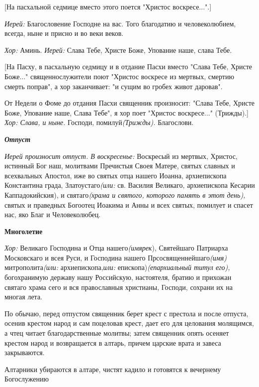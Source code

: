  [На пасхальной седмице вместо этого поется "Христос воскресе...".] 

 {\itshape  Иерей:} Благословение Господне на вас. Того благодатию и человеколюбием, всегда, ныне и присно и во веки веков.

 {\itshape  Хор:} Аминь. {\itshape  Иерей:} Слава Тебе, Христе Боже, Упование наше, слава Тебе.

     [На Пасху, в пасхальную седмицу и в отдание Пасхи вместо "Слава Тебе, Христе Боже..." священнослужители поют "Христос воскресе из мертвых, смертию смерть поправ", а хор заканчивает: "и сущим во гробех живот даровав". 

     От Недели о Фоме до отдания Пасхи священник произносит: "Слава Тебе, Христе Боже, Упование наше, Слава Тебе", я хор поет "Христос воскресе..." (Трижды).] {\itshape  Хор: Слава, и ныне.} Господи, помилуй{\itshape  (Трижды).} Благослови.  

\medskip 

 {\bfseries {\itshape  Отпуст }}

 {\itshape  Иерей произносит отпуст. В воскресенье:} Воскресый из мертвых, Христос, истинный Бог наш, молитвами Пречистыя Своея Матере, святых славных и всехвальных Апостол, иже во святых отца нашего Иоанна, архиепископа Константина града, Златоустаго{\itshape  (или:} св. Василия Великаго, архиепископа Кесарии Каппадокийския), и святаго{\itshape  (храма и святого, которого память в этот день),} святых и праведных Богоотец Иоакима и Анны и всех святых, помилует и спасет нас, яко Благ и Человеколюбец. 

\medskip 

 {\bfseries  Многолетие }

 {\itshape  Хор:} Великаго Господина и Отца нашего{\itshape  (имярек}), Святейшаго Патриарха Московскаго и всея Руси, и Господина нашего Прсосвященнейшаго{\itshape  (имя)} митрополита{\itshape  (или:} архиепископа,{\itshape  или:} епископа){\itshape  (епархиальный титул его),} богохранимую державу нашу Российскую, настоятеля, братию и прихожан святаго храма сего и вся православныя христианы, Господи, сохрани их на многая лета. 

\medskip 

  По обычаю, перед отпустом священник берет крест с престола и после отпуста, осенив крестом народ и сам поцеловав крест, дает его для целования молящимся, а чтец читает благодарственные молитвы; затем священник опять осеняет крестом народ и возвращается в алтарь, причем царские врата и завеса закрываются.

   Алтарники убираются в алтаре, чистят кадило и готовятся к вечернему Богослужению 
